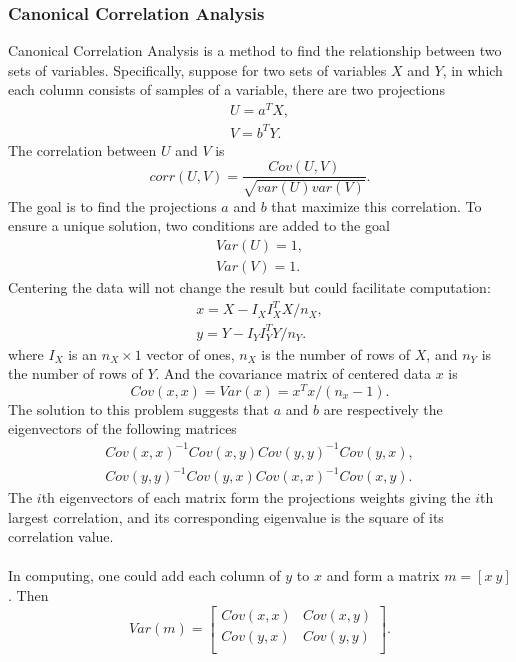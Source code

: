 \documentclass[12pt]{article}
\begin{document}
\subsubsection{Canonical Correlation Analysis}
Canonical Correlation Analysis is a method to find the relationship between two sets of variables. Specifically, suppose for two sets of variables $X$ and $Y$, in which each column consists of samples of a variable, there are two projections\begin{gather}
U=a^TX,\\
V=b^TY.
\end{gather}
The correlation between $U$ and $V$ is\begin{equation}
corr(U,V)=\frac{Cov(U,V)}{\sqrt{var(U)var(V)}}.
\end{equation}
The goal is to find the projections $a$ and $b$ that maximize this correlation. To ensure a unique solution, two conditions are added to the goal\begin{gather}
Var(U)=1,\\
Var(V)=1.
\end{gather}
Centering the data will not change the result but could facilitate computation:\begin{gather}
x=X-I_XI_X^TX/n_X,\\
y=Y-I_YI_Y^TY/n_Y.
\end{gather}
where $I_X$ is an $n_X \times 1$ vector of ones, $n_X$ is the number of rows of $X$, and $n_Y$ is the number of rows of $Y$. And the covariance matrix of centered data $x$ is \begin{equation}
Cov(x,x) = Var(x)=x^Tx/(n_x - 1).
\end{equation}
The solution to this problem suggests that $a$ and $b$ are respectively the eigenvectors of the following matrices\begin{gather}
Cov(x,x) ^{-1} Cov(x,y) Cov(y, y) ^{-1} Cov(y, x),\\
Cov(y,y) ^{-1} Cov(y,x) Cov(x, x) ^{-1} Cov(x, y).
\end{gather}
The $i$th eigenvectors of each matrix form the projections weights giving the $i$th largest correlation, and its corresponding eigenvalue is the square of its correlation value.\\
\\
In computing, one could add each column of $y$ to $x$ and form a matrix $m = [x~ y]$. Then \begin{equation}
Var(m) = \left[\begin{array}{ccc}
    Cov(x,x) & Cov(x,y) \\
    Cov(y,x) & Cov(y,y)\\ 
  \end{array}
  \right].
\end{equation}
\end{document}
